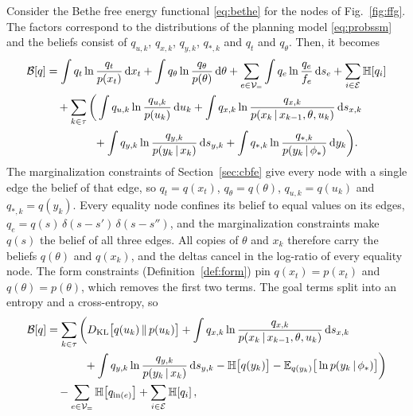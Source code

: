 \documentclass{l4dc2027}
\def\rmd{\mathrm{d}}
\newcommand\given[1][]{\,#1\vert\,}
\newcommand{\E}{\mathbb{E}}
\newcommand{\KL}{D_{\mathrm{KL}}}
\newenvironment{proofof}[1]{\par\noindent{\bfseries\upshape Proof of #1\ }}{\jmlrQED}
\begin{document}
\begin{proofof}{Lemma~\ref{lem:collapse}}
Consider the Bethe free energy functional \eqref{eq:bethe} for the nodes of Fig.~\ref{fig:ffg}. The factors correspond to the distributions of the planning model \eqref{eq:probssm} and the beliefs consist of $q_{u,k}$, $q_{x,k}$, $q_{y,k}$, $q_{*,k}$ and $q_t$ and $q_\theta$. Then, it becomes
\begin{align}
	\mathcal{B}[q] &= \int q_t \ln\frac{q_t}{p(x_t)}\,\rmd x_t + \int q_\theta \ln\frac{q_\theta}{p(\theta)}\,\rmd\theta + \sum_{e\in\mathcal{V}_=} \int q_e \ln\frac{q_e}{f_e}\,\rmd s_e + \sum_{i\in\mathcal{E}} \mathbb{H}[q_i] \nonumber\\
	&\quad + \sum_{k\in\tau} \bigg( \int q_{u,k} \ln\frac{q_{u,k}}{p(u_k)}\,\rmd u_k + \int q_{x,k} \ln\frac{q_{x,k}}{p(x_k \given x_{k-1}, \theta, u_k)}\,\rmd s_{x,k} \nonumber\\
	&\hphantom{\quad + \sum_{k\in\tau} \bigg(} + \int q_{y,k} \ln\frac{q_{y,k}}{p(y_k \given x_k)}\,\rmd s_{y,k} + \int q_{*,k} \ln\frac{q_{*,k}}{p(y_k \given \phi_*)}\,\rmd y_k \bigg) . \label{eq:bethe-full}
\end{align}
The marginalization constraints of Section~\ref{sec:cbfe} give every node with a single edge the belief of that edge, so $q_t = q(x_t)$, $q_\theta = q(\theta)$, $q_{u,k} = q(u_k)$ and $q_{*,k} = q(y_k)$. Every equality node confines its belief to equal values on its edges, $q_e = q(s)\,\delta(s - s')\,\delta(s - s'')$, and the marginalization constraints make $q(s)$ the belief of all three edges. All copies of $\theta$ and $x_k$ therefore carry the beliefs $q(\theta)$ and $q(x_k)$, and the deltas cancel in the log-ratio of every equality node. The form constraints (Definition~\ref{def:form}) pin $q(x_t) = p(x_t)$ and $q(\theta) = p(\theta)$, which removes the first two terms. The goal terms split into an entropy and a cross-entropy, so
\begin{align}
	\mathcal{B}[q] &= \sum_{k\in\tau} \bigg( \KL\big[q(u_k) \,\|\, p(u_k)\big] + \int q_{x,k} \ln\frac{q_{x,k}}{p(x_k \given x_{k-1}, \theta, u_k)}\,\rmd s_{x,k} \nonumber\\
	&\hphantom{= \sum_{k\in\tau} \bigg(} + \int q_{y,k} \ln\frac{q_{y,k}}{p(y_k \given x_k)}\,\rmd s_{y,k} - \mathbb{H}\big[q(y_k)\big] - \E_{q(y_k)}\big[\ln p(y_k \given \phi_*)\big] \bigg) \nonumber\\
	&\quad - \sum_{e\in\mathcal{V}_=} \mathbb{H}\big[q_{\mathrm{in}(e)}\big] + \sum_{i\in\mathcal{E}} \mathbb{H}[q_i] \, , \label{eq:bethe-form}
\end{align}

\end{proofof}
\end{document}
